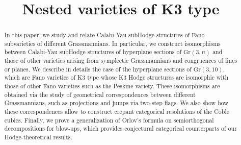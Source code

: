 \documentclass[JEP,XML,SOM,Unicode,NoEqCountersInSection]{cedram}
\theoremstyle{plain}
\theoremstyle{definition}
\begin{document}
\frontmatter
\title{Nested varieties of K3 type}

\author[\initial{M.} \lastname{Bernardara}]{ }
\address{Institut de Mathématiques de Toulouse; UMR 5219, UPS\\ F-31062 Toulouse Cedex 9, France}
\urladdr{}

\author[\initial{E.} \lastname{Fatighenti}]{ }
\address{Institut de Mathématiques de Toulouse; UMR 5219, UPS\\ F-31062 Toulouse Cedex 9, France}
\urladdr{}

\author[\initial{L.} \lastname{Manivel}]{\nobreakauthor {}}
\address{Institut de Mathématiques de Toulouse; UMR 5219, UPS\\ F-31062 Toulouse Cedex 9, France}
\urladdr{}

\begin{abstract}
In this paper, we study and relate Calabi-Yau subHodge structures of Fano subvarieties of different Grassmannians. In particular, we construct isomorphisms between Calabi-Yau subHodge structures of hyperplane sections of $\mathrm{Gr}(3,n)$ and those of other varieties arising from symplectic Grassmannians and congruences of lines or planes. We describe in details the case of the hyperplane sections of $\mathrm{Gr}(3,10)$, which are Fano varieties of K3 type whose K3 Hodge structures are isomorphic with those of other Fano varieties such as the Peskine variety. These isomorphisms are obtained via the study of geometrical correspondences between different Grassmannians, such as projections and jumps via two-step flags. We also show how these correspondences allow to construct crepant categorical resolutions of the Coble cubics. Finally, we prove a generalization of Orlov's formula on semiorthogonal decompositions for blow-ups, which provides conjectural categorical counterparts of our Hodge-theoretical results.
\end{abstract}



\end{document}
